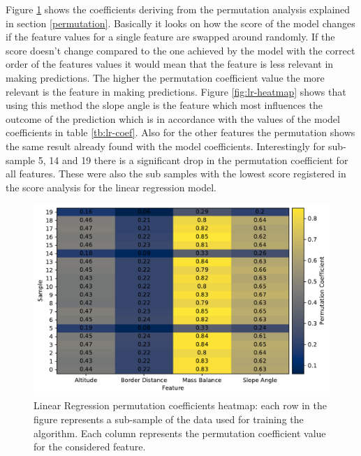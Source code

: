 Figure \ref{fig:rfr-heatmap} shows the coefficients deriving from the permutation analysis explained in section \ref{permutation}. Basically it looks on how the score of the model changes if the feature values for a single feature are swapped around randomly. If the score doesn't change compared to the one achieved by the model with the correct order of the features values it would mean that the feature is less relevant in making predictions. The higher the permutation coefficient value the more relevant is the feature in making predictions. Figure \ref{fig:lr-heatmap} shows that using this method the slope angle is the feature which most influences the outcome of the prediction which is in accordance with the values of the model coefficients in table \ref{tb:lr-coef}. Also for the other features the permutation shows the same result already found with the model coefficients. Interestingly for sub-sample 5, 14 and 19 there is a significant drop in the permutation coefficient for all features. These were also the sub samples with the lowest score registered in the score analysis for the linear regression model.

\begin{figure}[!tp]
	\centering		  
	\includegraphics[width=1.\textwidth]{figures/LR_heatmap.pdf}
	\caption{Linear Regression permutation coefficients heatmap: each row in the figure represents a sub-sample of the data used for training the algorithm. Each column represents the permutation coefficient value for the considered feature.}
	\label{fig:rfr-heatmap}
\end{figure}

